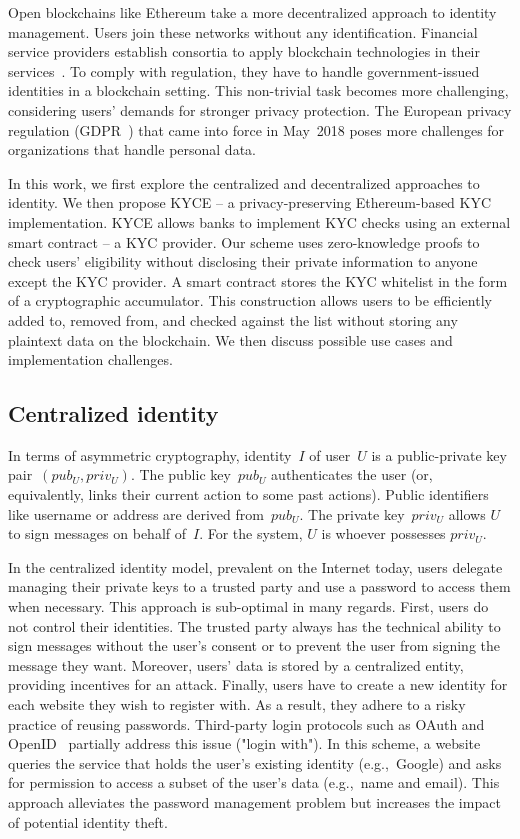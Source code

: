 Open blockchains like Ethereum take a more decentralized approach to identity management.
Users join these networks without any identification.
Financial service providers establish consortia to apply blockchain technologies in their services~\cite{EEA2017, Hyperledger, R3}.
To comply with regulation, they have to handle government-issued identities in a blockchain setting.
This non-trivial task becomes more challenging, considering users' demands for stronger privacy protection.
The European privacy regulation (GDPR~\cite{GDPR16}) that came into force in May~2018 poses more challenges for organizations that handle personal data.

In this work, we first explore the centralized and decentralized approaches to identity.
We then propose KYCE -- a privacy-preserving Ethereum-based KYC implementation.
KYCE allows banks to implement KYC checks using an external smart contract -- a KYC provider.
Our scheme uses zero-knowledge proofs to check users' eligibility without disclosing their private information to anyone except the KYC provider.
A smart contract stores the KYC whitelist in the form of a cryptographic accumulator.
This construction allows users to be efficiently added to, removed from, and checked against the list without storing any plaintext data on the blockchain.
We then discuss possible use cases and implementation challenges.

\subsection{Centralized identity}

In terms of asymmetric cryptography, identity~$I$ of user~$U$ is a public-private key pair~$(pub_U, priv_U)$.
The public key~$pub_U$ authenticates the user (or, equivalently, links their current action to some past actions).
Public identifiers like username or address are derived from~$pub_U$.
The private key~$priv_U$ allows $U$ to sign messages on behalf of~$I$.
For the system, $U$ is whoever possesses $priv_U$.

In the centralized identity model, prevalent on the Internet today, users delegate managing their private keys to a trusted party and use a password to access them when necessary.
This approach is sub-optimal in many regards.
First, users do not control their identities.
The trusted party always has the technical ability to sign messages without the user's consent or to prevent the user from signing the message they want.
Moreover, users' data is stored by a centralized entity, providing incentives for an attack.
Finally, users have to create a new identity for each website they wish to register with.
As a result, they adhere to a risky practice of reusing passwords.
Third-party login protocols such as OAuth and OpenID~\cite{Dodanduwa2018} partially address this issue ("login with").
In this scheme, a website queries the service that holds the user's existing identity (e.g.,~Google) and asks for permission to access a subset of the user's data (e.g.,~name and email).
This approach alleviates the password management problem but increases the impact of potential identity theft.

